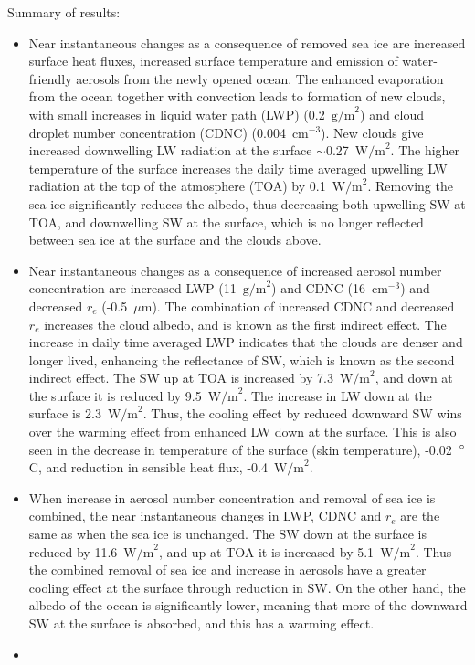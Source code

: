 Summary of results:
\begin{itemize}
\item Near instantaneous changes as a consequence of removed sea ice are increased surface heat fluxes, increased surface temperature and emission of water-friendly aerosols from the newly opened ocean. The enhanced evaporation from the ocean together with convection leads to formation of new clouds, with small increases in liquid water path (LWP) (0.2~$\text{g/m}^2$) and cloud droplet number concentration (CDNC) (0.004~$\text{cm}^{-3}$). New clouds give increased downwelling LW radiation at the surface $\sim$0.27~$\text{W/m}^2$. The higher temperature of the surface increases the daily time averaged upwelling LW radiation at the top of the atmosphere (TOA) by 0.1~$\text{W/m}^2$. Removing the sea ice significantly reduces the albedo, thus decreasing both upwelling SW at TOA, and downwelling SW at the surface, which is no longer reflected between sea ice at the surface and the clouds above.
\item Near instantaneous changes as a consequence of increased aerosol number concentration are increased LWP (11~$\text{g/m}^2$) and CDNC (16~$\text{cm}^{-3}$) and decreased $r_e$ (-0.5~$\mu\text{m}$). The combination of increased CDNC and decreased $r_e$ increases the cloud albedo, and is known as the first indirect effect. The increase in daily time averaged LWP indicates that the clouds are denser and longer lived, enhancing the reflectance of SW, which is known as the second indirect effect. The SW up at TOA is increased by 7.3~$\text{W/m}^2$, and down at the surface it is reduced by 9.5~$\text{W/m}^2$. The increase in LW down at the surface is 2.3~$\text{W/m}^2$. Thus, the cooling effect by reduced downward SW wins over the warming effect from enhanced LW down at the surface. This is also seen in the decrease in temperature of the surface (skin temperature), -0.02~$\degree$C, and reduction in sensible heat flux, -0.4~$\text{W/m}^2$.
\item When increase in aerosol number concentration and removal of sea ice is combined, the near instantaneous changes in LWP, CDNC and $r_e$ are the same as when the sea ice is unchanged. The SW down at the surface is reduced by 11.6~$\text{W/m}^2$, and up at TOA it is increased by 5.1~$\text{W/m}^2$. Thus the combined removal of sea ice and increase in aerosols have a greater cooling effect at the surface through reduction in SW. On the other hand, the albedo of the ocean is significantly lower, meaning that more of the downward SW at the surface is absorbed, and this has a warming effect.
\item 
\end{itemize}

